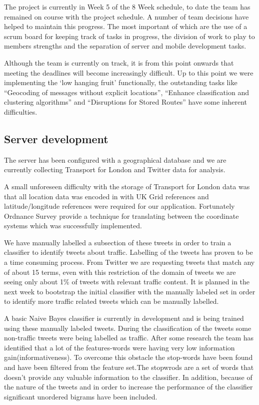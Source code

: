 ﻿The project is currently in Week 5 of the 8 Week schedule, to date the team has
remained on course with the project schedule. A number of team decisions have
helped to maintain this progress. The most important of which are the use of a
scrum board for keeping track of tasks in progress, the division of work to
play to members strengths and the separation of server and mobile development
tasks.

Although the team is currently on track, it is from this point onwards that
meeting the deadlines will become increasingly difficult. Up to this point we
were implementing the ‘low hanging fruit’ functionally, the outstanding tasks
like “Geocoding of messages without explicit locations”, “Enhance
classification and clustering algorithms” and “Disruptions for Stored Routes”
have some inherent difficulties.

\subsection{Server development}

The server has been configured with a geographical database and we are
currently collecting Transport for London and Twitter data for analysis.

A small unforeseen difficulty with the storage of Transport for London data was
that all location data was encoded in with UK Grid references and
latitude/longitude references were required for our application. Fortunately
Ordnance Survey provide a technique for translating between the coordinate
systems which was successfully implemented.

We have manually labelled a subsection of these tweets in order to train a
classifier to identify tweets about traffic. Labelling of the tweets has proven
to be a time consuming process. From Twitter we are requesting tweets that
match any of about 15 terms, even with this restriction of the domain of tweets
we are seeing only about 1\% of tweets with relevant traffic content. It is
planned in the next week to bootstrap the initial classifier with the manually
labeled set in order to identify more traffic related tweets which can be
manually labelled.

A basic Naive Bayes classifier is currently in development and is being trained
using these manually labeled tweets. During the classification  of the tweets
some non-traffic tweets were being labelled as traffic. After some 
research the team has identified that a lot of the features-words were having
very low information gain(informativeness). To overcome this obstacle the
stop-words have been found and have been filtered from the feature set.The stopwrods 
are a set of words that doesn't provide any valuable information to the classifier.  In
addition, because of the nature of the tweets and in order to increase the
performance of the classifier significant unordered bigrams have been included. 

